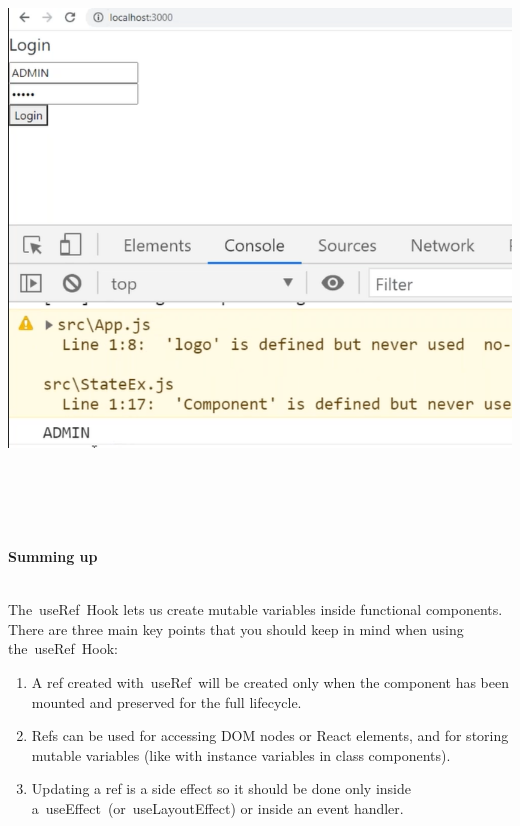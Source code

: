 \documentclass{article}
\begin{document}
\noindent 

\noindent 

\begin{center}
	\noindent \includegraphics*[width=6.23in, height=5.44in]{IMG-10-17}
\end{center}

\noindent 

\noindent 

\noindent 

\noindent \\\\

\noindent \textbf{Summing up}

\noindent \\
The~useRef~Hook lets us create mutable variables inside functional components. There are three main key points that you should keep in mind when using the~useRef~Hook:

\begin{enumerate}
\item  A ref created with~useRef~will be created only when the component has been mounted and preserved for the full lifecycle.

\item  Refs can be used for accessing DOM nodes or React elements, and for storing mutable variables (like with instance variables in class components).

\item  Updating a ref is a side effect so it should be done only inside a~useEffect~(or~useLayoutEffect) or inside an event handler.
\end{enumerate}
\end{document}
